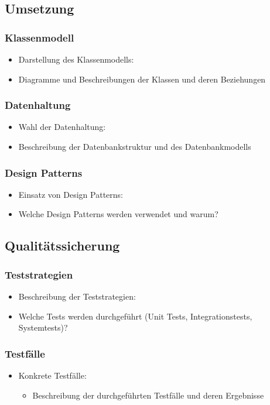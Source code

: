 \subsection{Umsetzung}\label{umsetzung}

\subsubsection{Klassenmodell}\label{klassenmodell}

\begin{itemize}
\item
  Darstellung des Klassenmodells:
\item
  Diagramme und Beschreibungen der Klassen und deren Beziehungen
\end{itemize}

\subsubsection{Datenhaltung}\label{datenhaltung}

\begin{itemize}
\item
  Wahl der Datenhaltung:
\item
  Beschreibung der Datenbankstruktur und des Datenbankmodells
\end{itemize}

\subsubsection{Design Patterns}\label{design-patterns}

\begin{itemize}
\item
  Einsatz von Design Patterns:
\item
  Welche Design Patterns werden verwendet und warum?
\end{itemize}

\subsection{Qualitätssicherung}\label{qualituxe4tssicherung}

\subsubsection{Teststrategien}\label{teststrategien}

\begin{itemize}
\item
  Beschreibung der Teststrategien:
\item
  Welche Tests werden durchgeführt (Unit Tests, Integrationstests, Systemtests)?
\end{itemize}

\subsubsection{Testfälle}\label{testfuxe4lle}

\begin{itemize}
\item
  Konkrete Testfälle:

  \begin{itemize}
  
  \item
    Beschreibung der durchgeführten Testfälle und deren Ergebnisse
  \end{itemize}
\end{itemize}